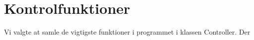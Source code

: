 \section{Kontrolfunktioner}
Vi valgte at samle de vigtigste funktioner i programmet i klassen Controller. Der 